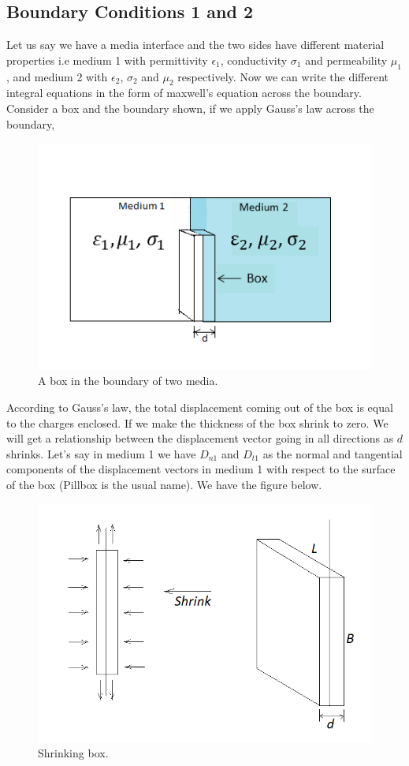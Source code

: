 \subsection{Boundary Conditions 1 and 2}
Let us say we have a media interface and the two sides have different material properties i.e medium 1 with permittivity $\epsilon_1$, conductivity $\sigma_1$ and permeability $\mu_1$, and medium 2 with $\epsilon_2$, $\sigma_2$ and $\mu_2$ respectively. Now we can write the different integral equations in the form of maxwell's equation across the boundary. Consider a box and the boundary shown, if we apply Gauss's law across the boundary,
\begin{figure}[h]
\centering
\includegraphics[width=1.1\linewidth]{./graphics/box_in_boundary}
\caption{A box in the boundary of two media.}
\end{figure}

According to Gauss's law, the total displacement coming out of the box is equal to the charges enclosed. If we make the thickness of the box shrink to zero. We will get a relationship between the displacement vector going in all directions as $d$ shrinks.  Let's say in medium 1 we have $D_{n1}$ and $D_{t1}$ as the normal and tangential components of the displacement vectors in medium 1 with respect to the surface of the box (Pillbox is the usual name). We have the figure below.
\begin{figure}[h]
\centering
\includegraphics[width=.7\linewidth]{./graphics/diemedium2}
\caption{Shrinking box.}
\end{figure}

